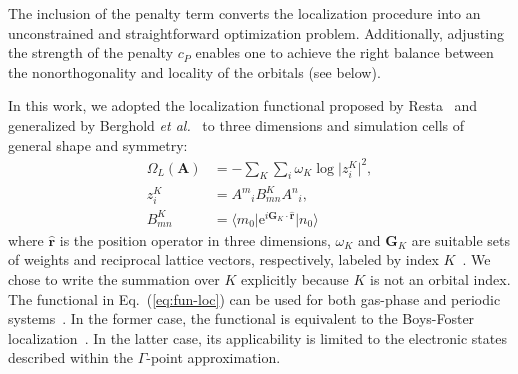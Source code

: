 \documentclass[aps,prl,reprint,amsmath,amssymb]{revtex4-1}
\newcommand*{\imi}{i} %
\newcommand*{\E}{\mathrm{e}}
\newcommand{\ket}[1]{\ensuremath{\vert #1 \rangle}}
\newcommand{\bra}[1]{\ensuremath{\langle #1 \vert}}
\newcommand{\op}[1]{\ensuremath{\hat{#1}}} %
\begin{document}
The inclusion of the penalty term converts the localization procedure into an unconstrained and straightforward optimization problem. Additionally, adjusting the strength of the penalty $c_P$ enables one to achieve the right balance between the nonorthogonality and locality of the orbitals (see below). 

In this work, we adopted the localization functional proposed by Resta~\cite{resta1998quantum, resta1999electron} and generalized by Berghold \emph{et al.}~\cite{berghold2000general} to three dimensions and simulation cells of general shape and symmetry: 
%
\begin{equation} \label{eq:fun-loc}
\begin{split}
\Omega_L(\mathbf{A}) &= - \sum_K \sum_i \omega_K \log \vert z_{i}^{K} \vert^2, \\
z_{i}^{K} &= {A^m}_i B^{K}_{mn} {A^n}_i, \\
B^{K}_{mn} &= \bra{m_0} \E^{\imi \mathbf{G}_K \cdot \mathbf{\op{r}}} \ket{n_0}
\end{split}
\end{equation}
%
where $\mathbf{\op{r}}$ is the position operator in three dimensions, $\omega_K$ and $\mathbf{G}_K$ are suitable sets of weights and reciprocal lattice vectors, respectively, labeled by index $K$~\cite{silvestrelli1999maximally, berghold2000general}. We chose to write the summation over $K$ explicitly because $K$ is not an orbital index. The functional in Eq.~(\ref{eq:fun-loc}) can be used for both gas-phase and periodic systems~\cite{berghold2000general}. In the former case, the functional is equivalent to the Boys-Foster localization~\cite{berghold2000general, resta1999electron}. In the latter case, its applicability is limited to the electronic states described within the $\Gamma$-point approximation.
\end{document}
